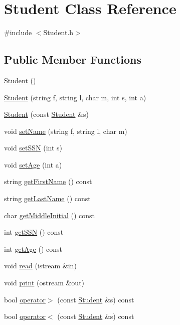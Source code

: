 \hypertarget{classStudent}{}\section{Student Class Reference}
\label{classStudent}


{\ttfamily \#include $<$Student.\+h$>$}

\subsection*{Public Member Functions}
\begin{DoxyCompactItemize}
\item 
\hyperlink{classStudent_af9168cedbfa5565cf0b20c1a9d3f5c9d}{Student} ()
\item 
\hyperlink{classStudent_a557917f9af87042e5fa25bd7b1aeaa30}{Student} (string f, string l, char m, int s, int a)
\item 
\hyperlink{classStudent_a9b3d40ac356f6794eeae74ce473a5617}{Student} (const \hyperlink{classStudent}{Student} \&s)
\item 
void \hyperlink{classStudent_a30731c688a4d7e3c047605de86c78007}{set\+Name} (string f, string l, char m)
\item 
void \hyperlink{classStudent_a46dafabdf7259d22c2ed038d187018d6}{set\+S\+SN} (int s)
\item 
void \hyperlink{classStudent_aae26ec99b719c86b60b33e19bc4f3986}{set\+Age} (int a)
\item 
string \hyperlink{classStudent_ac0c4ea968202c325e11b33ef38087701}{get\+First\+Name} () const 
\item 
string \hyperlink{classStudent_ae58e20cf8d78eecdbbd34c04f7a2c846}{get\+Last\+Name} () const 
\item 
char \hyperlink{classStudent_a9f266c04ecea344e544f9e772921d17c}{get\+Middle\+Initial} () const 
\item 
int \hyperlink{classStudent_acb222ca39f470aaa1562a25d329e8378}{get\+S\+SN} () const 
\item 
int \hyperlink{classStudent_a05e941545afe646579a8e91dfc8f1953}{get\+Age} () const 
\item 
void \hyperlink{classStudent_afeae2ddd8936ba4f37064a8d751f51eb}{read} (istream \&in)
\item 
void \hyperlink{classStudent_a17a6f00e4ec4637f77a50c2769e69721}{print} (ostream \&out)
\item 
bool \hyperlink{classStudent_a3f82e382259835b187fd92f2b15fcb42}{operator$>$} (const \hyperlink{classStudent}{Student} \&s) const 
\item 
bool \hyperlink{classStudent_a4add57e859306b4a543368201ca0922f}{operator$<$} (const \hyperlink{classStudent}{Student} \&s) const 
\end{DoxyCompactItemize}
